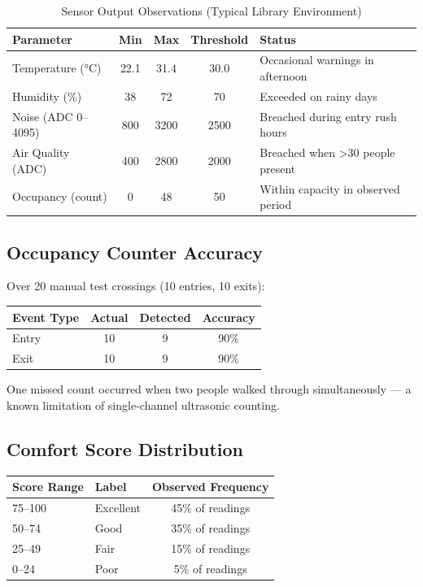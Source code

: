 \documentclass[12pt,a4paper]{article}
\begin{document}
\begin{table}[H]
\centering
\caption{Sensor Output Observations (Typical Library Environment)}
\begin{tabular}{l c c c l}
\toprule
\textbf{Parameter} & \textbf{Min} & \textbf{Max} & \textbf{Threshold} & \textbf{Status} \\
\midrule
Temperature (°C)  & 22.1 & 31.4 & 30.0 & Occasional warnings in afternoon \\
Humidity (\%)     & 38   & 72   & 70   & Exceeded on rainy days \\
Noise (ADC 0–4095)& 800  & 3200 & 2500 & Breached during entry rush hours \\
Air Quality (ADC) & 400  & 2800 & 2000 & Breached when >30 people present \\
Occupancy (count) & 0    & 48   & 50   & Within capacity in observed period \\
\bottomrule
\end{tabular}
\end{table}

\subsection{Occupancy Counter Accuracy}

Over 20 manual test crossings (10 entries, 10 exits):

\begin{table}[H]
\centering
\begin{tabular}{l c c c}
\toprule
\textbf{Event Type} & \textbf{Actual} & \textbf{Detected} & \textbf{Accuracy} \\
\midrule
Entry & 10 & 9 & 90\% \\
Exit  & 10 & 9 & 90\% \\
\bottomrule
\end{tabular}
\end{table}

\noindent One missed count occurred when two people walked through simultaneously — a known limitation of single-channel ultrasonic counting.

\subsection{Comfort Score Distribution}

\begin{center}
\begin{tabular}{l l c}
\toprule
\textbf{Score Range} & \textbf{Label} & \textbf{Observed Frequency} \\
\midrule
75–100 & Excellent & 45\% of readings \\
50–74  & Good      & 35\% of readings \\
25–49  & Fair      & 15\% of readings \\
0–24   & Poor      & 5\% of readings \\
\bottomrule
\end{tabular}
\end{center}
\end{document}
